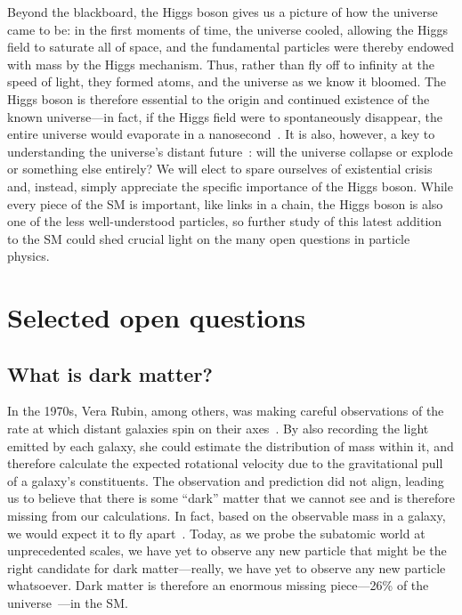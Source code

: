 Beyond the blackboard, the Higgs boson gives us a picture of how the universe came to be: in the first moments of time, the universe cooled, allowing the Higgs field to saturate all of space, and the fundamental particles were thereby endowed with mass by the Higgs mechanism. 
Thus, rather than fly off to infinity at the speed of light, they formed atoms, and the universe as we know it bloomed.  
The Higgs boson is therefore essential to the origin and continued existence of the known universe---in fact, if the Higgs field were to spontaneously disappear, the entire universe would evaporate in a nanosecond~\cite{P5Report}. 
It is also, however, a key to understanding the universe's distant future~\cite{Bass2021}: will the universe collapse or explode or something else entirely? 
We will elect to spare ourselves of existential crisis and, instead, simply appreciate the specific importance of the Higgs boson. 
While every piece of the SM is important, like links in a chain, the Higgs boson is also one of the less well-understood particles, so further study of this latest addition to the SM could shed crucial light on the many open questions in particle physics. 

\section{Selected open questions}\label{sec:open_questions}
\subsection{What is dark matter?}
In the 1970s, Vera Rubin, among others, was making careful observations of the rate at which distant galaxies spin on their axes~\cite{VeraRubin}.  
By also recording the light emitted by each galaxy, she could estimate the distribution of mass within it, and therefore calculate the expected rotational velocity due to the gravitational pull of a galaxy's constituents. 
The observation and prediction did not align, leading us to believe that there is some ``dark'' matter that we cannot see and is therefore missing from our calculations. 
In fact, based on the observable mass in a galaxy, we would expect it to fly apart~\cite{GalaxyDM}. 
Today, as we probe the subatomic world at unprecedented scales, we have yet to observe any new particle that might be the right candidate for dark matter---really, we have yet to observe any new particle whatsoever. 
Dark matter is therefore an enormous missing piece---26\% of the universe~\cite{PlanckDM}---in the SM.

